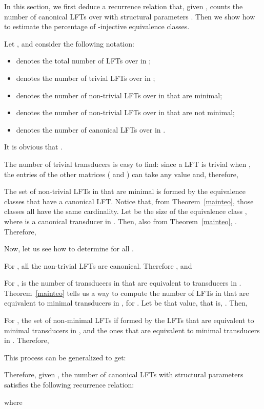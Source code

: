 \documentclass{ocg}
\newcommand{\LFT}{LFT}
\begin{document}
In this section, we first deduce a recurrence relation that, given
, counts the number of canonical \LFT{}s over 
with structural parameters . Then we show how to estimate the
percentage of -injective equivalence classes.

Let , and consider the following
notation:
\begin{itemize}
\item  denotes the total number of \LFT{}s over  in ;
\item  denotes the number of trivial \LFT{}s over  in ;
\item  denotes the number of non-trivial \LFT{}s over  in
   that are minimal;
\item  denotes the number of non-trivial \LFT{}s over 
  in  that are not minimal;
\item  denotes the number of canonical \LFT{}s over  in
  .
\end{itemize}
It is obvious that .

The number of trivial transducers is easy to find: since a \LFT{} is
trivial when , the entries of the other matrices ( and )
can take any value and, therefore,

The set of non-trivial \LFT{}s in  that are minimal is
formed by the equivalence classes that have a canonical \LFT{}. Notice
that, from Theorem~\ref{mainteo}, those classes all have the same
cardinality. Let  be the size of the equivalence class
, where  is a canonical transducer in
. Then, also from Theorem~\ref{mainteo}, . Therefore,

Now, let us see how to determine  for all
. 

For , all the non-trivial
\LFT{}s are canonical. Therefore , and

For ,  is the number of transducers in  that
are equivalent to transducers in . Theorem~\ref{mainteo} tells
us a way to compute the number of \LFT{}s in  that are
equivalent to minimal transducers in , for . Let  be that value, that is, . Then,

For , the set of non-minimal \LFT{}s if formed by the \LFT{}s
that are equivalent to minimal transducers in , and the ones
that are equivalent to minimal transducers in . Therefore,

This process can be generalized to get:

Therefore, given , the number of
canonical \LFT{}s with structural parameters  satisfies the
following recurrence relation:

where  
\end{document}
